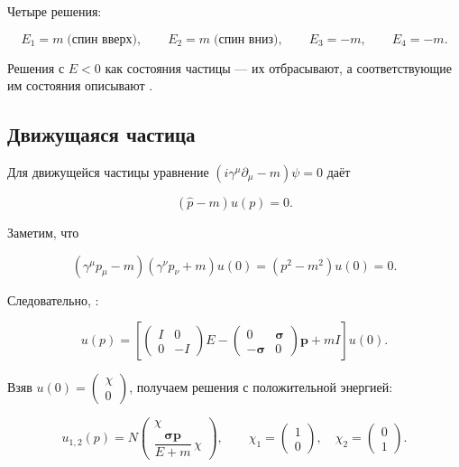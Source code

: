 \documentclass[../final.tex]{subfiles}
\begin{document}
Четыре решения:

\begin{equation*}
    E_1=m\;\text{(спин вверх)},
    \qquad
    E_2=m\;\text{(спин вниз)},
    \qquad
    E_3=-m,
    \qquad
    E_4=-m.
\end{equation*}

Решения с $E<0$  как состояния частицы ---
их отбрасывают, а соответствующие им состояния описывают
.


\subsection{Движущаяся частица}

Для движущейся частицы уравнение
$\left(i\gamma^\mu\partial_\mu-m\right)\psi=0$ даёт

\begin{equation*}
    \left(\hat p-m\right)u(p)=0.
\end{equation*}

Заметим, что

\begin{equation*}
    \left(\gamma^\mu p_\mu-m\right)
    \left(\gamma^\nu p_\nu+m\right)u(0)
    =
    \left(p^2-m^2\right)u(0)
    =
    0.
\end{equation*}

Следовательно, :

\begin{equation*}
    u(p)
    =
    \left[
        \begin{pmatrix}
            I & 0\\
            0 & -I
        \end{pmatrix}E
        -
        \begin{pmatrix}
            0 & \boldsymbol\sigma\\
            -\boldsymbol\sigma & 0
        \end{pmatrix}\mathbf p
        +
        mI
    \right]u(0).
\end{equation*}

Взяв $u(0)=\begin{pmatrix}\chi\\0\end{pmatrix}$, получаем решения
с положительной энергией:

\begin{equation*}
    u_{1,2}(p)
    =
    N
    \begin{pmatrix}
        \chi\\[4pt]
        \dfrac{\boldsymbol\sigma\mathbf p}{E+m}\,\chi
    \end{pmatrix},
    \qquad
    \chi_1
    =
    \begin{pmatrix}
        1\\0
    \end{pmatrix},
    \quad
    \chi_2
    =
    \begin{pmatrix}
        0\\1
    \end{pmatrix}.
\end{equation*}
\end{document}
